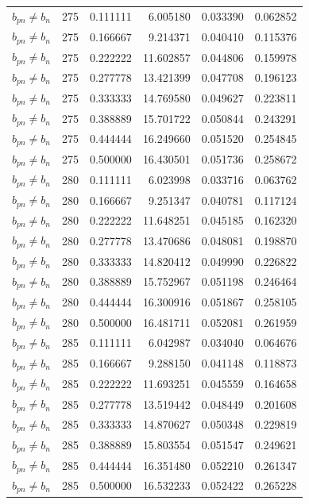 \begin{longtable}{l r r r r r}
$b_{pn} \neq b_n$ & 275 & 0.111111 & 6.005180 & 0.033390 & 0.062852 \\
$b_{pn} \neq b_n$ & 275 & 0.166667 & 9.214371 & 0.040410 & 0.115376 \\
$b_{pn} \neq b_n$ & 275 & 0.222222 & 11.602857 & 0.044806 & 0.159978 \\
$b_{pn} \neq b_n$ & 275 & 0.277778 & 13.421399 & 0.047708 & 0.196123 \\
$b_{pn} \neq b_n$ & 275 & 0.333333 & 14.769580 & 0.049627 & 0.223811 \\
$b_{pn} \neq b_n$ & 275 & 0.388889 & 15.701722 & 0.050844 & 0.243291 \\
$b_{pn} \neq b_n$ & 275 & 0.444444 & 16.249660 & 0.051520 & 0.254845 \\
$b_{pn} \neq b_n$ & 275 & 0.500000 & 16.430501 & 0.051736 & 0.258672 \\
$b_{pn} \neq b_n$ & 280 & 0.111111 & 6.023998 & 0.033716 & 0.063762 \\
$b_{pn} \neq b_n$ & 280 & 0.166667 & 9.251347 & 0.040781 & 0.117124 \\
$b_{pn} \neq b_n$ & 280 & 0.222222 & 11.648251 & 0.045185 & 0.162320 \\
$b_{pn} \neq b_n$ & 280 & 0.277778 & 13.470686 & 0.048081 & 0.198870 \\
$b_{pn} \neq b_n$ & 280 & 0.333333 & 14.820412 & 0.049990 & 0.226822 \\
$b_{pn} \neq b_n$ & 280 & 0.388889 & 15.752967 & 0.051198 & 0.246464 \\
$b_{pn} \neq b_n$ & 280 & 0.444444 & 16.300916 & 0.051867 & 0.258105 \\
$b_{pn} \neq b_n$ & 280 & 0.500000 & 16.481711 & 0.052081 & 0.261959 \\
$b_{pn} \neq b_n$ & 285 & 0.111111 & 6.042987 & 0.034040 & 0.064676 \\
$b_{pn} \neq b_n$ & 285 & 0.166667 & 9.288150 & 0.041148 & 0.118873 \\
$b_{pn} \neq b_n$ & 285 & 0.222222 & 11.693251 & 0.045559 & 0.164658 \\
$b_{pn} \neq b_n$ & 285 & 0.277778 & 13.519442 & 0.048449 & 0.201608 \\
$b_{pn} \neq b_n$ & 285 & 0.333333 & 14.870627 & 0.050348 & 0.229819 \\
$b_{pn} \neq b_n$ & 285 & 0.388889 & 15.803554 & 0.051547 & 0.249621 \\
$b_{pn} \neq b_n$ & 285 & 0.444444 & 16.351480 & 0.052210 & 0.261347 \\
$b_{pn} \neq b_n$ & 285 & 0.500000 & 16.532233 & 0.052422 & 0.265228 \\

\end{longtable}
